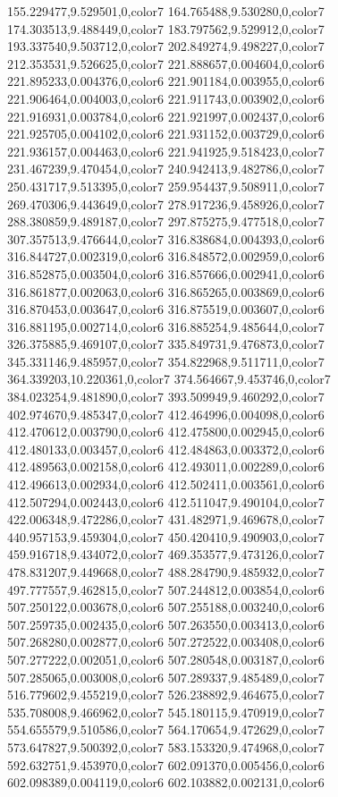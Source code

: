 155.229477,9.529501,0,color7
164.765488,9.530280,0,color7
174.303513,9.488449,0,color7
183.797562,9.529912,0,color7
193.337540,9.503712,0,color7
202.849274,9.498227,0,color7
212.353531,9.526625,0,color7
221.888657,0.004604,0,color6
221.895233,0.004376,0,color6
221.901184,0.003955,0,color6
221.906464,0.004003,0,color6
221.911743,0.003902,0,color6
221.916931,0.003784,0,color6
221.921997,0.002437,0,color6
221.925705,0.004102,0,color6
221.931152,0.003729,0,color6
221.936157,0.004463,0,color6
221.941925,9.518423,0,color7
231.467239,9.470454,0,color7
240.942413,9.482786,0,color7
250.431717,9.513395,0,color7
259.954437,9.508911,0,color7
269.470306,9.443649,0,color7
278.917236,9.458926,0,color7
288.380859,9.489187,0,color7
297.875275,9.477518,0,color7
307.357513,9.476644,0,color7
316.838684,0.004393,0,color6
316.844727,0.002319,0,color6
316.848572,0.002959,0,color6
316.852875,0.003504,0,color6
316.857666,0.002941,0,color6
316.861877,0.002063,0,color6
316.865265,0.003869,0,color6
316.870453,0.003647,0,color6
316.875519,0.003607,0,color6
316.881195,0.002714,0,color6
316.885254,9.485644,0,color7
326.375885,9.469107,0,color7
335.849731,9.476873,0,color7
345.331146,9.485957,0,color7
354.822968,9.511711,0,color7
364.339203,10.220361,0,color7
374.564667,9.453746,0,color7
384.023254,9.481890,0,color7
393.509949,9.460292,0,color7
402.974670,9.485347,0,color7
412.464996,0.004098,0,color6
412.470612,0.003790,0,color6
412.475800,0.002945,0,color6
412.480133,0.003457,0,color6
412.484863,0.003372,0,color6
412.489563,0.002158,0,color6
412.493011,0.002289,0,color6
412.496613,0.002934,0,color6
412.502411,0.003561,0,color6
412.507294,0.002443,0,color6
412.511047,9.490104,0,color7
422.006348,9.472286,0,color7
431.482971,9.469678,0,color7
440.957153,9.459304,0,color7
450.420410,9.490903,0,color7
459.916718,9.434072,0,color7
469.353577,9.473126,0,color7
478.831207,9.449668,0,color7
488.284790,9.485932,0,color7
497.777557,9.462815,0,color7
507.244812,0.003854,0,color6
507.250122,0.003678,0,color6
507.255188,0.003240,0,color6
507.259735,0.002435,0,color6
507.263550,0.003413,0,color6
507.268280,0.002877,0,color6
507.272522,0.003408,0,color6
507.277222,0.002051,0,color6
507.280548,0.003187,0,color6
507.285065,0.003008,0,color6
507.289337,9.485489,0,color7
516.779602,9.455219,0,color7
526.238892,9.464675,0,color7
535.708008,9.466962,0,color7
545.180115,9.470919,0,color7
554.655579,9.510586,0,color7
564.170654,9.472629,0,color7
573.647827,9.500392,0,color7
583.153320,9.474968,0,color7
592.632751,9.453970,0,color7
602.091370,0.005456,0,color6
602.098389,0.004119,0,color6
602.103882,0.002131,0,color6
